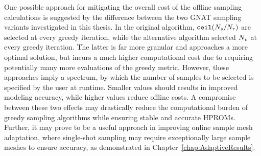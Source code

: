 One possible approach for mitigating the overall cost of the offline sampling calculations is suggested by the difference between the two GNAT sampling variants investigated in this thesis. In the original algorithm, $\mathtt{ceil}(N_s / N_r)$ are selected at every greedy iteration, while the alternative algorithm selected $N_{v}$ at every greedy iteration. The latter is far more granular and approaches a more optimal solution, but incurs a much higher computational cost due to requiring potentially many more evaluations of the greedy metric. However, these approaches imply a spectrum, by which the number of samples to be selected is specified by the user at runtime. Smaller values should results in improved modeling accuracy, while higher values reduce offline costs. A compromise between these two effects may drastically reduce the computational burden of greedy sampling algorithms while ensuring stable and accurate HPROMs. Further, it may prove to be a useful approach in improving online sample mesh adaptation, where single-shot sampling may require exceptionally large sample meshes to ensure accuracy, as demonstrated in Chapter~\ref{chap:AdaptiveResults}.